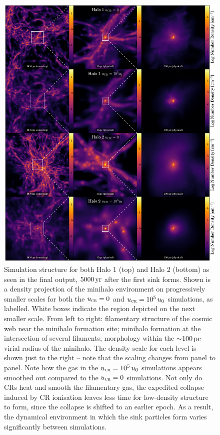 \documentclass[../thesis.tex]{subfiles}
\begin{document}
\begin{figure}
\begin{center}
\includegraphics[width=\columnwidth]{figures/structure/structure}
\caption{\label{fig:structure}
Simulation structure for both Halo 1 (top) and Halo 2 (bottom) as seen in the final output, $5000\,\mathrm{yr}$ after the first sink forms.  
Shown is a density projection of the minihalo environment on progressively smaller scales for both the ${u}_{\textsc{cr}}=0$ and ${u}_{\textsc{cr}}=10^5\,u_0$ simulations, as labelled.  
White boxes indicate the region depicted on the next smaller scale.  
From left to right: filamentary structure of the cosmic web near the minihalo formation site; minihalo formation at the intersection of several filaments; morphology within the $\sim$$100\,\mathrm{pc}$ virial radius of the minihalo. 
The density scale for each level is shown just to the right -- note that the scaling changes from panel to panel.
Note how the gas in the ${u}_{\textsc{cr}}=10^5\,u_0$ simulations appears smoothed out compared to the ${u}_{\textsc{cr}}=0$ simulations.  
Not only do CRs heat and smooth the filamentary gas, the expedited collapse induced by CR ionisation leaves less time for low-density structure to form, since the collapse is shifted to an earlier epoch.  
As a result, the dynamical environment in which the sink particles form varies significantly between simulations.%
}
\end{center}
\end{figure}
\end{document}
